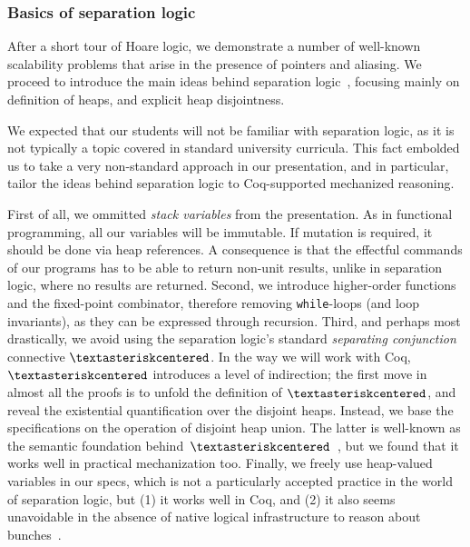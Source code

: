 \documentclass[blockstyle,preprint,nocopyrightspace]{sigplanconf}
\newcommand{\an}[1]{\textcolor{red}{(Aleks: {#1})}}
\newcommand{\code}[1]{\lstinline{#1}}
\newcommand{\sep}{\textasteriskcentered}
\begin{document}
\subsubsection{Basics of separation logic}
\label{sec:sep-log}
After a short tour of Hoare logic, we demonstrate a number of
well-known scalability problems that arise in the presence of pointers
and aliasing. We proceed to introduce the main ideas behind separation
logic~\cite{Ishtiaq-Ohearn:POPL01,Reynolds:LICS02}, focusing mainly on
definition of heaps, and explicit heap disjointness.
%

We expected that our students will not be familiar with separation
logic, as it is not typically a topic covered in standard university
curricula. This fact embolded us to take a very non-standard approach
in our presentation, and in particular, tailor the ideas behind
separation logic to Coq-supported mechanized reasoning.

%
First of all, we ommitted \emph{stack variables} from the
presentation. As in functional programming, all our variables will be
immutable. If mutation is required, it should be done via heap
references. A consequence is that the effectful commands of our
programs has to be able to return non-unit results, unlike in
separation logic, where no results are returned.  Second, we introduce
higher-order functions and the fixed-point combinator, therefore
removing \code{while}-loops (and loop invariants), as they can be
expressed through recursion.  Third, and perhaps most drastically, we
avoid using the separation logic's standard \emph{separating
  conjunction} connective $\sep$. In the way we will work with Coq,
$\sep$ introduces a level of indirection; the first move in almost all
the proofs is to unfold the definition of $\sep$, and reveal the
existential quantification over the disjoint heaps. Instead, we base
the specifications on the operation of disjoint heap union. The latter
is well-known as the semantic foundation
behind~$\sep$~\cite{Calcagno-al:LICS07}, but we found that it works
well in practical mechanization too. Finally, we freely use
heap-valued variables in our specs, which is not a particularly
accepted practice in the world of separation logic, but (1) it works
well in Coq, and (2) it also seems unavoidable in the absence of
native logical infrastructure to reason about
bunches~\cite{Nanevski-al:POPL10}.
\end{document}
